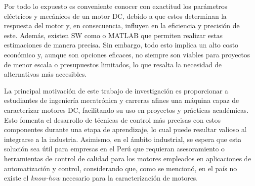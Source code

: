     \noindent
    Por todo lo expuesto es conveniente conocer con exactitud los parámetros eléctricos y mecánicos de un motor \ac{DC}, debido a que estos determinan la respuesta del motor y, en consecuencia, influyen en la eficiencia y precisión de este. Además, existen \ac{SW} como \textcite{etap} o MATLAB que permiten realizar estas estimaciones de manera precisa. Sin embargo, todo esto implica un alto costo económico y, aunque son opciones eficaces, no siempre son viables para proyectos de menor escala o presupuestos limitados, lo que resalta la necesidad de alternativas más accesibles.

    \noindent
    La principal motivación de este trabajo de investigación es proporcionar a estudiantes de ingeniería mecatrónica y carreras afines una máquina capaz de caracterizar motores DC, facilitando su uso en proyectos y prácticas académicas. Esto fomenta el desarrollo de técnicas de control más precisas con estos componentes durante una etapa de aprendizaje, lo cual puede resultar valioso al integrarse a la industria. Asimismo, en el ámbito industrial, se espera que esta solución sea útil para empresas en el Perú que requieran asesoramiento o herramientas de control de calidad para los motores empleados en aplicaciones de automatización y control, considerando que, como se mencionó, en el país no existe el \textit{know-how} necesario para la caracterización de motores.

    

